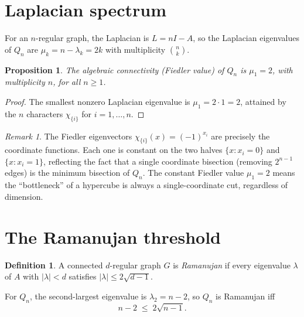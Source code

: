 \documentclass[11pt,a4paper]{article}
\theoremstyle{plain}
\newtheorem{proposition}[theorem]{Proposition}
\theoremstyle{definition}
\newtheorem{definition}[theorem]{Definition}
\theoremstyle{remark}
\newtheorem{remark}[theorem]{Remark}
\begin{document}
\section{Laplacian spectrum}

For an $n$-regular graph, the Laplacian is $L = nI - A$, so the Laplacian
eigenvalues of $Q_n$ are $\mu_k = n - \lambda_k = 2k$ with multiplicity
$\binom{n}{k}$.

\begin{proposition}
The algebraic connectivity (Fiedler value) of $Q_n$ is $\mu_1 = 2$, with
multiplicity $n$, for all $n \ge 1$.
\end{proposition}

\begin{proof}
The smallest nonzero Laplacian eigenvalue is $\mu_1 = 2\cdot 1 = 2$,
attained by the $n$ characters $\chi_{\{i\}}$ for $i = 1, \ldots, n$.
\end{proof}

\begin{remark}
The Fiedler eigenvectors $\chi_{\{i\}}(x) = (-1)^{x_i}$ are precisely the
coordinate functions. Each one is constant on the two halves
$\{x : x_i = 0\}$ and $\{x : x_i = 1\}$, reflecting the fact that a single
coordinate bisection (removing $2^{n-1}$ edges) is the minimum bisection of
$Q_n$. The constant Fiedler value $\mu_1 = 2$ means the ``bottleneck'' of a
hypercube is always a single-coordinate cut, regardless of dimension.
\end{remark}


\section{The Ramanujan threshold}

\begin{definition}
A connected $d$-regular graph $G$ is \emph{Ramanujan} if every eigenvalue
$\lambda$ of $A$ with $|\lambda| < d$ satisfies $|\lambda| \le 2\sqrt{d-1}$.
\end{definition}

For $Q_n$, the second-largest eigenvalue is $\lambda_2 = n - 2$, so $Q_n$ is
Ramanujan iff
\begin{equation}\label{eq:ram}
  n - 2 \;\le\; 2\sqrt{n-1}.
\end{equation}
\end{document}
